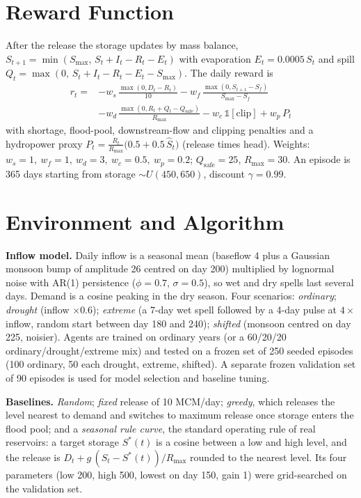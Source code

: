 \documentclass[10pt,twocolumn]{article}
\begin{document}
\section{Reward Function}
After the release the storage updates by mass balance,
$S_{t+1}=\min(S_{\max},\,S_t+I_t-R_t-E_t)$ with evaporation $E_t=0.0005\,S_t$ and spill $Q_t=\max(0,\,S_t+I_t-R_t-E_t-S_{\max})$. The daily reward is
\begin{align*}
r_t = &-w_s\,\tfrac{\max(0,D_t-R_t)}{10} - w_f\,\tfrac{\max(0,S_{t+1}-S_f)}{S_{\max}-S_f} \\
      &- w_d\,\tfrac{\max(0,R_t+Q_t-Q_{\text{safe}})}{R_{\max}} - w_c\,\mathbb{1}[\text{clip}] + w_p\,P_t
\end{align*}
with shortage, flood-pool, downstream-flow and clipping penalties and a hydropower proxy $P_t=\tfrac{R_t}{R_{\max}}\big(0.5+0.5\,\hat S_t\big)$ (release times head). Weights: $w_s=1,\ w_f=1,\ w_d=3,\ w_c=0.5,\ w_p=0.2$; $Q_{\text{safe}}=25$, $R_{\max}=30$. An episode is 365 days starting from storage $\sim U(450,650)$, discount $\gamma=0.99$.

\section{Environment and Algorithm}
\textbf{Inflow model.} Daily inflow is a seasonal mean (baseflow 4 plus a Gaussian monsoon bump of amplitude 26 centred on day 200) multiplied by lognormal noise with AR(1) persistence ($\phi=0.7$, $\sigma=0.5$), so wet and dry spells last several days. Demand is a cosine peaking in the dry season. Four scenarios: \emph{ordinary}; \emph{drought} (inflow $\times0.6$); \emph{extreme} (a 7-day wet spell followed by a 4-day pulse at $4\times$ inflow, random start between day 180 and 240); \emph{shifted} (monsoon centred on day 225, noisier). Agents are trained on ordinary years (or a 60/20/20 ordinary/drought/extreme mix) and tested on a frozen set of 250 seeded episodes (100 ordinary, 50 each drought, extreme, shifted). A separate frozen validation set of 90 episodes is used for model selection and baseline tuning.

\textbf{Baselines.} \emph{Random}; \emph{fixed} release of 10 MCM/day; \emph{greedy}, which releases the level nearest to demand and switches to maximum release once storage enters the flood pool; and a \emph{seasonal rule curve}, the standard operating rule of real reservoirs: a target storage $S^*(t)$ is a cosine between a low and high level, and the release is $D_t+g\,(S_t-S^*(t))/R_{\max}$ rounded to the nearest level. Its four parameters (low 200, high 500, lowest on day 150, gain 1) were grid-searched on the validation set.
\end{document}
